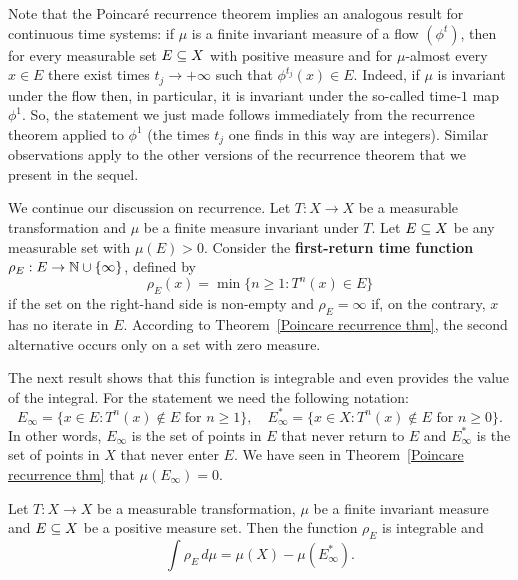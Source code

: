Note that the Poincar\'e recurrence theorem implies an analogous result for continuous time systems: if $\mu$ is a finite invariant measure of a flow $(\phi^t)$, then for every measurable set $E\subseteq X$ with positive measure and for $\mu$-almost every $x\in E$ there exist times $t_j\to+\infty$ such that $\phi^{t_j}(x)\in E$. Indeed, if $\mu$ is invariant under the flow then, in particular, it is invariant under the so-called time-$1$ map $\phi^1$. So, the statement we just made follows immediately from the recurrence theorem applied to $\phi^1$ (the times $t_j$ one finds in this way are integers). Similar observations apply to the other versions of the recurrence theorem that we present in the sequel.\par
We continue our discussion on recurrence. Let $T:X\to X$ be a measurable transformation and $\mu$ be a finite measure invariant under $T$. Let $E\subseteq X$ be any measurable set with $\mu(E)>0$. Consider the \textbf{first-return time function} $\rho_E:E\to\mathbb{N}\cup\{\infty\}$, defined by
\[\rho_E(x)=\min\{n\geq 1:T^n(x)\in E\}\]
if the set on the right-hand side is non-empty and $\rho_E=\infty$ if, on the contrary, $x$ has no iterate in $E$. According to Theorem~\ref{Poincare recurrence thm}, the second alternative occurs only on a set with zero measure.\par
The next result shows that this function is integrable and even provides the
value of the integral. For the statement we need the following notation:
\[E_\infty=\{x\in E:T^n(x)\notin E\text{ for $n\geq 1$}\},\quad E_\infty^*=\{x\in X:T^n(x)\notin E\text{ for $n\geq 0$}\}.\]
In other words, $E_\infty$ is the set of points in $E$ that never return to $E$ and $E_\infty^*$ is the set of points in $X$ that never enter $E$. We have seen in Theorem~\ref{Poincare recurrence thm} that $\mu(E_\infty)=0$.
\begin{theorem}\label{Kac reccurence}
Let $T:X\to X$ be a measurable transformation, $\mu$ be a finite invariant measure and $E\subseteq X$ be a positive measure set. Then the function $\rho_E$ is integrable and
\[\int\rho_E\,d\mu=\mu(X)-\mu(E_\infty^*).\]
\end{theorem}
